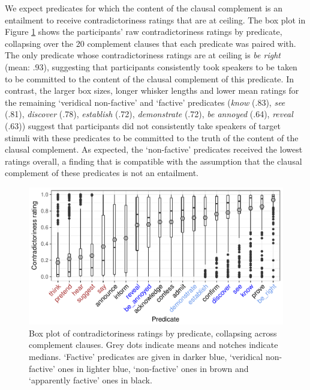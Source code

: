 \documentclass[11pt,fleqn]{article}
\newcommand{\6}{\mbox{$[\hspace*{-.6mm}[$}}
\newcommand{\9}{\mbox{$]\hspace*{-.6mm}]$}}
\begin{document}
{We expect predicates for which the content of the clausal complement is an entailment to receive contradictoriness ratings that are at ceiling. The box plot in Figure \ref{f-veridicality-predicate} shows the participants' raw contradictoriness ratings by predicate, collapsing over the 20 complement clauses that each predicate was paired with. The only predicate whose contradictoriness ratings are at ceiling is {\em be right} (mean: .93), suggesting that participants consistently took speakers to be taken to be committed to the content of the clausal complement of this predicate. In contrast, the larger box sizes, longer whisker lengths and lower mean ratings for the remaining `veridical non-factive' and `factive' predicates ({\em know} (.83), {\em see} (.81), {\em discover} (.78), {\em establish} (.72), {\em demonstrate} (.72), {\em be annoyed} (.64), {\em reveal} (.63)) suggest that participants did not consistently take speakers of target stimuli with these predicates to be committed to the truth of the content of the clausal complement. As expected, the `non-factive' predicates received the lowest ratings overall, a finding that is compatible with the assumption that the clausal complement of these predicates is not an entailment.

\begin{figure}[h!]
\centering

\includegraphics[width=.75\paperwidth]{../results/2-veridicality2/graphs/boxplot-veridicality}

\caption{Box plot of contradictoriness ratings by predicate, collapsing across complement clauses. Grey dots indicate means and notches indicate medians. `Factive' predicates are given in darker blue, `veridical non-factive' ones in lighter blue, `non-factive' ones in brown and `apparently factive' ones in black.}
\label{f-veridicality-predicate}
\end{figure}

}
\end{document}
